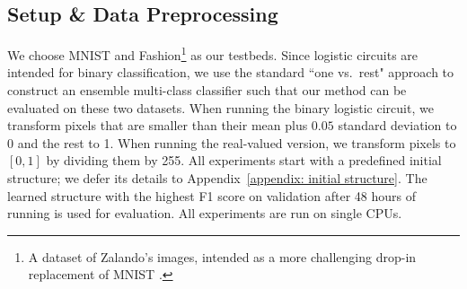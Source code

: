 \documentclass[letterpaper]{article} %
\begin{document}
 \subsection{Setup \& Data Preprocessing}
 We choose MNIST and Fashion\footnote{A dataset of Zalando's images,  intended as a more challenging drop-in replacement of MNIST \cite{fashion2017}.} as our testbeds.
 Since logistic circuits are intended for binary classification, we use the standard ``one vs.~rest" approach to construct an ensemble multi-class classifier such that our method can be evaluated on these two datasets. When running the binary logistic circuit, we transform pixels that are smaller than their mean plus $0.05$ standard deviation to 0 and the rest to 1. When running the real-valued version, we transform pixels to $[0,1]$ by dividing them by 255. All experiments start with a predefined initial structure; we defer its details to Appendix~\ref{appendix: initial structure}.
  The learned structure with the highest F1 score on validation after 48 hours of running is used for evaluation. All experiments are run on single CPUs.
\end{document}
